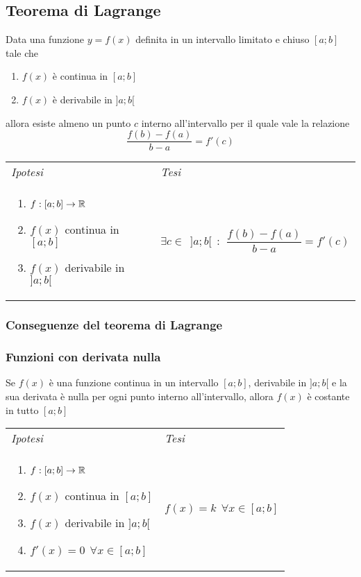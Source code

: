 \documentclass{article}     %
\begin{document}
    \subsection{Teorema di Lagrange}
        \begin{shadedTheorem}[Lagrange]
        Data una funzione $y=f(x)$ definita in un intervallo limitato e chiuso $[a;b]$ tale che \begin{enumerate}
            \item $f(x)$ è continua in $[a;b]$
            \item $f(x)$ è derivabile in $]a;b[$
        \end{enumerate}
        allora esiste almeno un punto $c$ interno all'intervallo per il quale vale la relazione \[\frac{f(b)-f(a)}{b-a}=f'(c)\]
        \end{shadedTheorem}
        \begin{tabular}{m{}m{}}
            \textit{Ipotesi} & \textit{Tesi}  \\
            \begin{enumerate}
            \item $f:[a;b] \to \mathbb{R}$
            \item $f(x)$ continua in $[a;b]$
            \item $f(x)$ derivabile in $]a;b[$
        \end{enumerate} & $\exists c \in~~]a;b[ ~~:~~ \dfrac{f(b)-f(a)}{b-a}=f'(c)$
        \end{tabular}
        \subsubsection*{Conseguenze del teorema di Lagrange}
        \subsubsection{Funzioni con derivata nulla}
            \begin{shadedTheorem}
                Se $f(x)$ è una funzione continua in un intervallo $[a;b]$, derivabile in $]a;b[$ e la sua derivata è nulla per ogni punto interno all'intervallo, allora $f(x)$ è costante in tutto $[a;b]$
            \end{shadedTheorem}
            \begin{tabular}{m{}m{}}
                \textit{Ipotesi} & \textit{Tesi}  \\ 
                \begin{enumerate}
                \item $f:[a;b] \to \mathbb{R}$
                \item $f(x)$ continua in $[a;b]$
                \item $f(x)$ derivabile in $]a;b[$
                \item $f'(x)=0~~\forall x \in [a;b]$
        \end{enumerate} & $f(x)=k ~~ \forall x \in [a;b]$
           \end{tabular}
           
\end{document}

